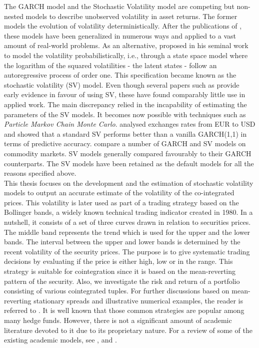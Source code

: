 \documentclass[11pt,a4,twosided,singlespacing,titlepagenumber=on]{scrreprt}
\numberwithin{equation}{chapter} %
\theoremstyle{remark}
\begin{document}

The GARCH model and the Stochastic Volatility model are competing but non-nested models to describe unobserved volatility in asset returns. The former models the evolution of volatility deterministically. After the publications of \cite{engle1986}, these models have been generalized in numerous ways and applied to a vast amount of real-world problems. As an alternative, \cite{taylor1982} proposed in his seminal work to model the volatility probabilistically, i.e., through a state space model where the logarithm of the squared volatilities - the latent states - follow an autoregressive process of order one. This specification became known as the stochastic volatility (SV) model. Even though several papers such as \cite{kim1998} provide early evidence in favour of using SV, these have found comparably little use in applied work. The main discrepancy relied in the incapability of estimating the parameters of the SV models. It becomes now possible with techniques such as \textit{Particle Markov Chain Monte Carlo}. \cite{kastner2014} analysed exchanges rates from EUR to USD and showed that a standard SV performs better than a vanilla GARCH(1,1) in terms of predictive accuracy. \cite{chan2015} compare a number of GARCH and SV models on commodity markets. SV models generally compared favourably to their GARCH counterparts. The SV models have been retained as the default models for all the reasons specified above. \\


This thesis focuses on the development and the estimation of stochastic volatility models to output an accurate estimate of the volatility of the co-integrated prices. This volatility is later used as part of a trading strategy based on the Bollinger bands, a widely known technical trading indicator created in 1980. In a nutshell, it consists of a set of three curves drawn in relation to securities prices. The middle band represents the trend which is used for the upper and the lower bands. The interval between the upper and lower bands is determined by the recent volatility of the security prices. The purpose is to give systematic trading decisions by evaluating if the price is either high, low or in the range. This strategy is suitable for cointegration since it is based on the mean-reverting pattern of the security. Also, we investigate the risk and return of a portfolio consisting of various cointegrated tuples. For further discussions based on mean-reverting stationary spreads and illustrative numerical examples, the reader is referred to \cite{vidyamurthy2004}.  It is well known that those common strategies are popular among many hedge funds. However, there is not a significant amount of academic literature devoted to it due to its proprietary nature. For a review of some of the existing academic models, see \cite{gatev2006}, \cite{perlin2009} and \cite{broussard2012}. \\
\end{document}
